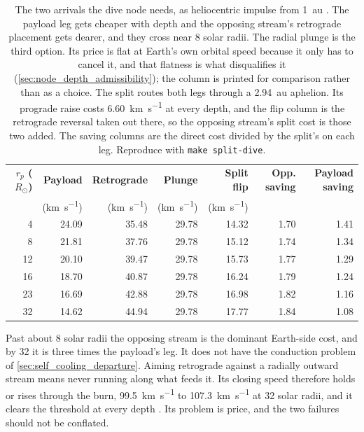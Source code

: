 \documentclass{article}
\begin{document}
\begin{table}[!htpb]
    \centering
    \caption{The two arrivals the dive node needs, as heliocentric impulse from \SI{1}{\astronomicalunit} \cite{Katz_aim_is_all_you_need_2025}. The payload leg gets cheaper with depth and the opposing stream's retrograde placement gets dearer, and they cross near 8 solar radii. The radial plunge is the third option. Its price is flat at Earth's own orbital speed because it only has to cancel it, and that flatness is what disqualifies it (\autoref{sec:node_depth_admissibility}); the column is printed for comparison rather than as a choice. The split routes both legs through a \SI{2.94}{\astronomicalunit} aphelion. Its prograde raise costs \SI{6.60}{\kilo\meter\per\second} at every depth, and the flip column is the retrograde reversal taken out there, so the opposing stream's split cost is those two added. The saving columns are the direct cost divided by the split's on each leg. Reproduce with \texttt{make split-dive}.}
    \label{tab:opposing_stream_depth}
    \begin{tabular}{|r|r|r|r|r|r|r|}\hline
        \textbf{$r_p$ ($R_\odot$)} & \textbf{Payload} & \textbf{Retrograde} & \textbf{Plunge} & \textbf{Split flip} & \textbf{Opp. saving} & \textbf{Payload saving} \\
        & (\si{\kilo\meter\per\second}) & (\si{\kilo\meter\per\second}) & (\si{\kilo\meter\per\second}) & (\si{\kilo\meter\per\second}) & & \\\hline
        4 & 24.09 & 35.48 & 29.78 & 14.32 & 1.70 & 1.41 \\\hline
        8 & 21.81 & 37.76 & 29.78 & 15.12 & 1.74 & 1.34 \\\hline
        12 & 20.10 & 39.47 & 29.78 & 15.73 & 1.77 & 1.29 \\\hline
        16 & 18.70 & 40.87 & 29.78 & 16.24 & 1.79 & 1.24 \\\hline
        23 & 16.69 & 42.88 & 29.78 & 16.98 & 1.82 & 1.16 \\\hline
        32 & 14.62 & 44.94 & 29.78 & 17.77 & 1.84 & 1.08 \\\hline
    \end{tabular}
\end{table}

Past about 8 solar radii the opposing stream is the dominant Earth-side cost, and by 32 it is three times the payload's leg. It does not have the conduction problem of \autoref{sec:self_cooling_departure}. Aiming retrograde against a radially outward stream means never running along what feeds it. Its closing speed therefore holds or rises through the burn, \SI{99.5}{\kilo\meter\per\second} to \SI{107.3}{\kilo\meter\per\second} at 32 solar radii, and it clears the threshold at every depth \cite{Katz_aim_is_all_you_need_2025}. Its problem is price, and the two failures should not be conflated.
\end{document}
